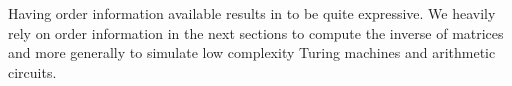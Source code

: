

Having order information available results in \langfor to be quite expressive. We heavily rely on order information in the next sections to compute the inverse of matrices and more generally to simulate low complexity Turing machines and arithmetic circuits.

